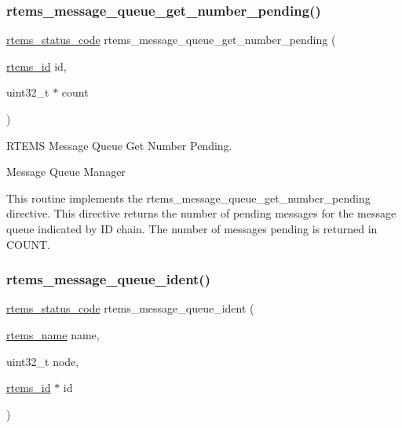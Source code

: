 \subsubsection{\texorpdfstring{rtems\_message\_queue\_get\_number\_pending()}{rtems\_message\_queue\_get\_number\_pending()}}
{\footnotesize\ttfamily \mbox{\hyperlink{group__ClassicStatus_ga545d41846817eaba6143d52ee4d9e9fe}{rtems\+\_\+status\+\_\+code}} rtems\+\_\+message\+\_\+queue\+\_\+get\+\_\+number\+\_\+pending (\begin{DoxyParamCaption}\item[{\mbox{\hyperlink{group__ClassicTasks_gab20892b814dced7dd4e5b9bf42becd57}{rtems\+\_\+id}}}]{id,  }\item[{uint32\+\_\+t $\ast$}]{count }\end{DoxyParamCaption})}



R\+T\+E\+MS Message Queue Get Number Pending. 

Message Queue Manager

This routine implements the rtems\+\_\+message\+\_\+queue\+\_\+get\+\_\+number\+\_\+pending directive. This directive returns the number of pending messages for the message queue indicated by ID chain. The number of messages pending is returned in C\+O\+U\+NT. \mbox{\label{group__ClassicMessageQueue_ga8c7981cad697c7ab925362919b9af2f8}} 
\subsubsection{\texorpdfstring{rtems\_message\_queue\_ident()}{rtems\_message\_queue\_ident()}}
{\footnotesize\ttfamily \mbox{\hyperlink{group__ClassicStatus_ga545d41846817eaba6143d52ee4d9e9fe}{rtems\+\_\+status\+\_\+code}} rtems\+\_\+message\+\_\+queue\+\_\+ident (\begin{DoxyParamCaption}\item[{\mbox{\hyperlink{group__ClassicTasks_ga55fb63c49f68c0cbd9bee004da15b1fd}{rtems\+\_\+name}}}]{name,  }\item[{uint32\+\_\+t}]{node,  }\item[{\mbox{\hyperlink{group__ClassicTasks_gab20892b814dced7dd4e5b9bf42becd57}{rtems\+\_\+id}} $\ast$}]{id }\end{DoxyParamCaption})}



